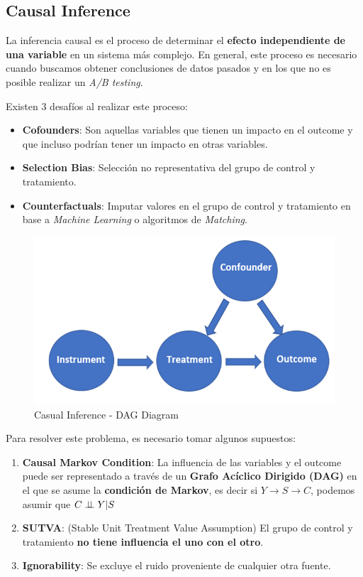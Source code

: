 \subsection{Causal Inference}

La inferencia causal es el proceso de determinar el \textbf{efecto independiente de una variable} en un sistema más complejo. En general, este proceso es necesario cuando buscamos obtener conclusiones de datos pasados y en los que no es posible realizar un \textit{A/B testing}.

Existen 3 desafíos al realizar este proceso: 
\begin{itemize}
    \item \textbf{Cofounders}: Son aquellas variables que tienen un impacto en el outcome y que incluso podrían tener un impacto en otras variables. 
    \item \textbf{Selection Bias}: Selección no representativa del grupo de control y tratamiento.
    \item \textbf{Counterfactuals}: Imputar valores en el grupo de control y tratamiento en base a \textit{Machine Learning} o algoritmos de \textit{Matching}. 
\end{itemize}

\begin{figure}[H]
    \center
    \includegraphics[scale=0.3]{notebooks/STATS/img/causal_inference_diagram.png}
    \caption{Casual Inference - DAG Diagram}
\end{figure}

Para resolver este problema, es necesario tomar algunos supuestos: 
\begin{enumerate}
    \item \textbf{Causal Markov Condition}: La influencia de las variables y el outcome puede ser representado a través de un \textbf{Grafo Acíclico Dirigido (DAG)} en el que se asume la \textbf{condición de Markov}, es decir si $Y \rightarrow S \rightarrow C$, podemos asumir que $C \perp \!\!\! \perp Y | S$
    \item \textbf{SUTVA}: (Stable Unit Treatment Value Assumption) El grupo de control y tratamiento \textbf{no tiene influencia el uno con el otro}. 
    \item \textbf{Ignorability}: Se excluye el ruido proveniente de cualquier otra fuente. 
\end{enumerate}

